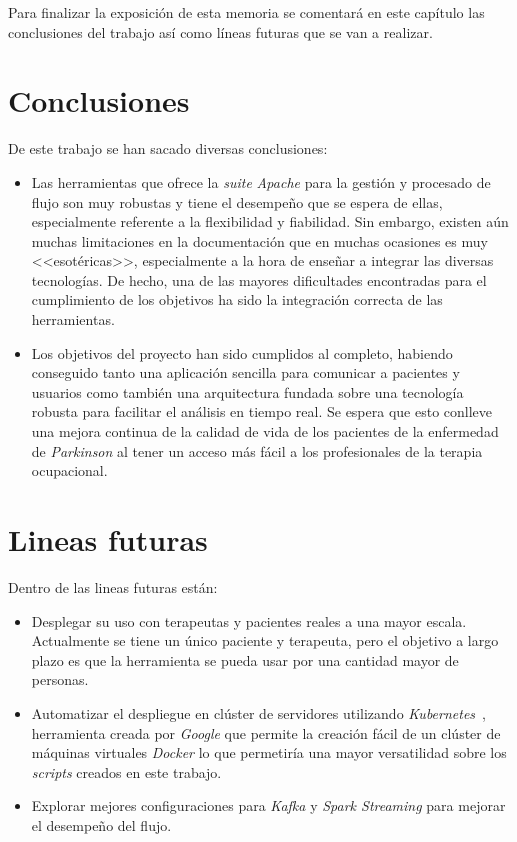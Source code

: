
Para finalizar la exposición de esta memoria se comentará en este capítulo las conclusiones del 
trabajo así como líneas futuras que se van a realizar.

\section{Conclusiones}

De este trabajo se han sacado diversas conclusiones:

\begin{itemize}
	\item Las herramientas que ofrece la \textit{suite} \textit{Apache} para la gestión y procesado de flujo son muy robustas y tiene el desempeño que se espera de ellas, especialmente referente a la flexibilidad y fiabilidad. Sin embargo, existen aún muchas limitaciones en la documentación que en muchas ocasiones es muy <<esotéricas>>, especialmente a la hora de enseñar a integrar las diversas tecnologías. De hecho, una de las mayores dificultades encontradas para el cumplimiento de los objetivos ha sido la integración correcta de las herramientas.
	\item Los objetivos del proyecto han sido cumplidos al completo, habiendo conseguido tanto una aplicación sencilla para comunicar a pacientes y usuarios como también una arquitectura fundada sobre una tecnología robusta para facilitar el análisis en tiempo real. Se espera que esto conlleve una mejora continua de la calidad de vida de los pacientes de la enfermedad de \textit{Parkinson} al tener un acceso más fácil a los profesionales de la terapia ocupacional.
\end{itemize}

\section{Lineas futuras}

Dentro de las lineas futuras están:

\begin{itemize}
	\item Desplegar su uso con terapeutas y pacientes reales a una mayor escala. Actualmente se tiene un único paciente y terapeuta, pero el objetivo a largo plazo es que la herramienta se pueda usar por una cantidad mayor de personas.
	\item Automatizar el despliegue en clúster de servidores utilizando \textit{Kubernetes}~\cite{losautoresdekubernetes2020}, herramienta creada por \textit{Google} que permite la creación fácil de un clúster de máquinas virtuales \textit{Docker} lo que permetiría una mayor versatilidad sobre los \textit{scripts} creados en este trabajo.
	\item Explorar mejores configuraciones para \textit{Kafka} y \textit{Spark Streaming} para mejorar el desempeño del flujo.
\end{itemize}